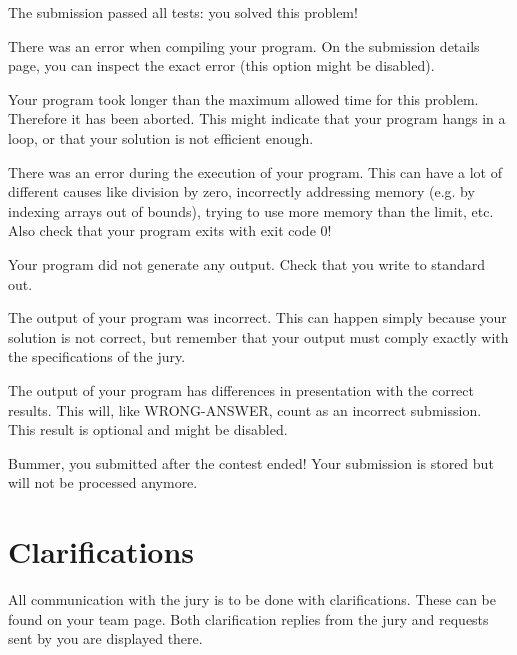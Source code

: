 \begin{description}[\setleftmargin{4.5cm}]
\item[CORRECT]
The submission passed all tests: you solved this problem!

\item[COMPILER-ERROR]
There was an error when compiling your program. On the submission
details page, you can inspect the exact error (this option might be
disabled).

\item[TIMELIMIT]
Your program took longer than the maximum allowed time for this
problem. Therefore it has been aborted. This might indicate that your
program hangs in a loop, or that your solution is not efficient
enough.

\item[RUN-ERROR]
There was an error during the execution of your program. This can have
a lot of different causes like division by zero, incorrectly
addressing memory (e.g. by indexing arrays out of bounds), trying to
use more memory than the limit, etc. 
Also check that your program exits with exit code 0!

\item[NO-OUTPUT]
Your program did not generate any output. Check that you write to
standard out.

\item[WRONG-ANSWER]
The output of your program was incorrect. This can happen simply
because your solution is not correct, but remember that your output
must comply exactly with the specifications of the jury.

\item[PRESENTATION-ERROR]
The output of your program has differences in presentation with the
correct results. This will, like WRONG-ANSWER, count as an incorrect
submission. This result is optional and might be disabled.

\item[TOO-LATE]
Bummer, you submitted after the contest ended! Your submission is
stored but will not be processed anymore.
\end{description}

\section{Clarifications}

All communication with the jury is to be done with clarifications.
These can be found on your team page. Both clarification replies from
the jury and requests sent by you are displayed there.

